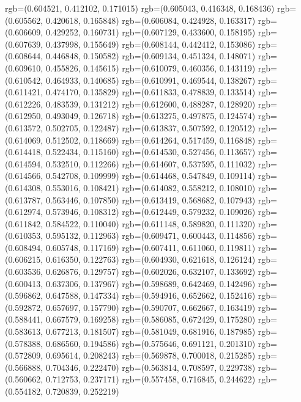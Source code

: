 {{{					rgb=(0.604521, 0.412102, 0.171015)
					rgb=(0.605043, 0.416348, 0.168436)
					rgb=(0.605562, 0.420618, 0.165848)
					rgb=(0.606084, 0.424928, 0.163317)
					rgb=(0.606609, 0.429252, 0.160731)
					rgb=(0.607129, 0.433600, 0.158195)
					rgb=(0.607639, 0.437998, 0.155649)
					rgb=(0.608144, 0.442412, 0.153086)
					rgb=(0.608644, 0.446848, 0.150582)
					rgb=(0.609134, 0.451324, 0.148071)
					rgb=(0.609610, 0.455826, 0.145615)
					rgb=(0.610079, 0.460356, 0.143119)
					rgb=(0.610542, 0.464933, 0.140685)
					rgb=(0.610991, 0.469544, 0.138267)
					rgb=(0.611421, 0.474170, 0.135829)
					rgb=(0.611833, 0.478839, 0.133514)
					rgb=(0.612226, 0.483539, 0.131212)
					rgb=(0.612600, 0.488287, 0.128920)
					rgb=(0.612950, 0.493049, 0.126718)
					rgb=(0.613275, 0.497875, 0.124574)
					rgb=(0.613572, 0.502705, 0.122487)
					rgb=(0.613837, 0.507592, 0.120512)
					rgb=(0.614069, 0.512502, 0.118669)
					rgb=(0.614264, 0.517459, 0.116848)
					rgb=(0.614418, 0.522434, 0.115160)
					rgb=(0.614530, 0.527456, 0.113657)
					rgb=(0.614594, 0.532510, 0.112266)
					rgb=(0.614607, 0.537595, 0.111032)
					rgb=(0.614566, 0.542708, 0.109999)
					rgb=(0.614468, 0.547849, 0.109114)
					rgb=(0.614308, 0.553016, 0.108421)
					rgb=(0.614082, 0.558212, 0.108010)
					rgb=(0.613787, 0.563446, 0.107850)
					rgb=(0.613419, 0.568682, 0.107943)
					rgb=(0.612974, 0.573946, 0.108312)
					rgb=(0.612449, 0.579232, 0.109026)
					rgb=(0.611842, 0.584522, 0.110040)
					rgb=(0.611148, 0.589820, 0.111320)
					rgb=(0.610353, 0.595132, 0.112963)
					rgb=(0.609471, 0.600443, 0.114856)
					rgb=(0.608494, 0.605748, 0.117169)
					rgb=(0.607411, 0.611060, 0.119811)
					rgb=(0.606215, 0.616350, 0.122763)
					rgb=(0.604930, 0.621618, 0.126124)
					rgb=(0.603536, 0.626876, 0.129757)
					rgb=(0.602026, 0.632107, 0.133692)
					rgb=(0.600413, 0.637306, 0.137967)
					rgb=(0.598689, 0.642469, 0.142496)
					rgb=(0.596862, 0.647588, 0.147334)
					rgb=(0.594916, 0.652662, 0.152416)
					rgb=(0.592872, 0.657697, 0.157790)
					rgb=(0.590707, 0.662667, 0.163419)
					rgb=(0.588441, 0.667579, 0.169258)
					rgb=(0.586085, 0.672429, 0.175280)
					rgb=(0.583613, 0.677213, 0.181507)
					rgb=(0.581049, 0.681916, 0.187985)
					rgb=(0.578388, 0.686560, 0.194586)
					rgb=(0.575646, 0.691121, 0.201310)
					rgb=(0.572809, 0.695614, 0.208243)
					rgb=(0.569878, 0.700018, 0.215285)
					rgb=(0.566888, 0.704346, 0.222470)
					rgb=(0.563814, 0.708597, 0.229738)
					rgb=(0.560662, 0.712753, 0.237171)
					rgb=(0.557458, 0.716845, 0.244622)
					rgb=(0.554182, 0.720839, 0.252219)
}}}
